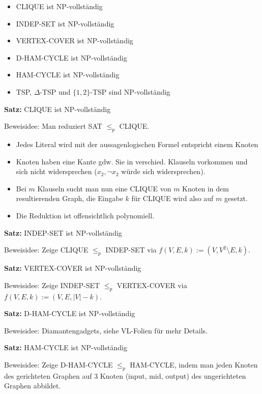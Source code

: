 \documentclass[a4paper,graphics,11pt]{article}
\begin{document}
\begin{itemize}
    \item CLIQUE ist \textsf{NP}-vollständig
    \item INDEP-SET ist \textsf{NP}-vollständig
    \item VERTEX-COVER ist \textsf{NP}-vollständig
    \item D-HAM-CYCLE ist \textsf{NP}-vollständig
    \item HAM-CYCLE ist \textsf{NP}-vollständig
    \item TSP, $\Delta$-TSP und $\{1,2\}$-TSP sind \textsf{NP}-vollständig
\end{itemize}


\textbf{Satz:} CLIQUE ist \textsf{NP}-vollständig

Beweisidee: Man reduziert SAT $\leq_p$ CLIQUE.

\begin{itemize}
    \item Jedes Literal wird mit der aussagenlogischen Formel entspricht einem Knoten
    \item Knoten haben eine Kante gdw. Sie in verschied. Klauseln vorkommen
        und sich nicht widersprechen ($x_2, \lnot x_2$ würde sich widersprechen).
    \item Bei $m$ Klauseln sucht man nun eine CLIQUE von $m$ Knoten in dem resultierenden Graph,
        die Eingabe $k$ für CLIQUE wird also auf $m$ gesetzt.
    \item Die Reduktion ist offensichtlich polynomiell.
\end{itemize}

\strut

\textbf{Satz:} INDEP-SET ist \textsf{NP}-vollständig

Beweisidee: Zeige CLIQUE $\leq_p$ INDEP-SET via $f(V,E,k) := (V,V^2 \setminus E, k)$.

\strut

\textbf{Satz:} VERTEX-COVER ist \textsf{NP}-vollständig

Beweisidee: Zeige INDEP-SET $\leq_p$ VERTEX-COVER via $f(V,E,k) := (V,E,|V|-k)$.

\strut

\textbf{Satz:} D-HAM-CYCLE ist \textsf{NP}-vollständig

Beweisidee: Diamantengadgets, siehe VL-Folien für mehr Details.

\strut

\textbf{Satz:} HAM-CYCLE ist \textsf{NP}-vollständig

Beweisidee: Zeige D-HAM-CYCLE $\leq_p$ HAM-CYCLE, indem man jeden Knoten
des gerichteten Graphen auf 3 Knoten (input, mid, output) des ungerichteten Graphen abbildet.
\end{document}
